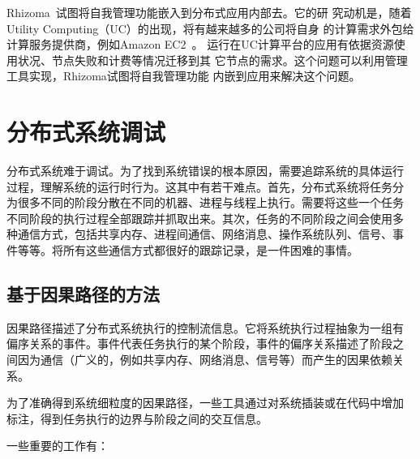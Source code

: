 Rhizoma~\cite{Rhizoma}试图将自我管理功能嵌入到分布式应用内部去。它的研
究动机是，随着Utility Computing（UC）的出现，将有越来越多的公司将自身
的计算需求外包给计算服务提供商，例如Amazon EC2~\cite{Garfinkel2007}。
运行在UC计算平台的应用有依据资源使用状况、节点失败和计费等情况迁移到其
它节点的需求。这个问题可以利用管理工具实现，Rhizoma试图将自我管理功能
内嵌到应用来解决这个问题。


\section{分布式系统调试}

分布式系统难于调试。为了找到系统错误的根本原因，需要追踪系统的具体运行
过程，理解系统的运行时行为。这其中有若干难点。首先，分布式系统将任务分
为很多不同的阶段分散在不同的机器、进程与线程上执行。需要将这些一个任务
不同阶段的执行过程全部跟踪并抓取出来。其次，任务的不同阶段之间会使用多
种通信方式，包括共享内存、进程间通信、网络消息、操作系统队列、信号、事
件等等。将所有这些通信方式都很好的跟踪记录，是一件困难的事情。

% 
% 
% 

\subsection{基于因果路径的方法}

因果路径描述了分布式系统执行的控制流信息。它将系统执行过程抽象为一组有
偏序关系的事件。事件代表任务执行的某个阶段，事件的偏序关系描述了阶段之
间因为通信（广义的，例如共享内存、网络消息、信号等）而产生的因果依赖关
系。

为了准确得到系统细粒度的因果路径，一些工具通过对系统插装或在代码中增加
标注，得到任务执行的边界与阶段之间的交互信息。

一些重要的工作有：

% 
% 
% 
% 
% 

